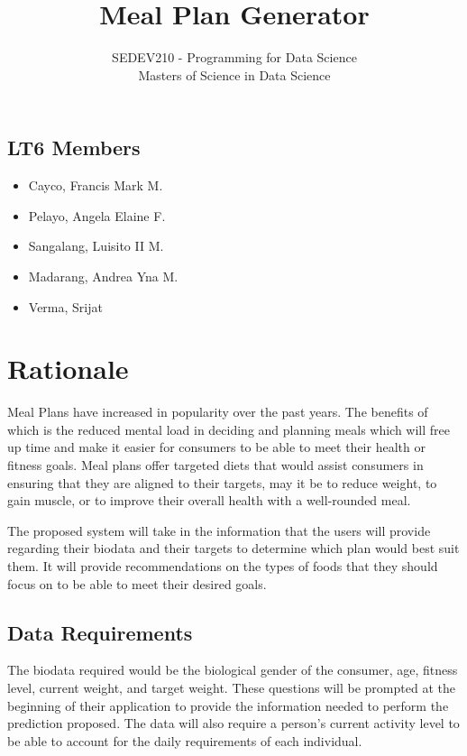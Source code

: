 \documentclass{article}
\title{Meal Plan Generator}
\author{SEDEV210 - Programming for Data Science\\Masters of Science in Data Science}
\date{}
\begin{document}
\maketitle



\subsection*{LT6 Members}
\begin{multicols}{2}
\begin{itemize}
    \item Cayco, Francis Mark M.
    \item Pelayo, Angela Elaine F.
    \item Sangalang, Luisito II M.
    \item Madarang, Andrea Yna M.
    \item Verma, Srijat
\end{itemize}
\end{multicols}

\tableofcontents

\section{Rationale}
Meal Plans have increased in popularity over the past years. The benefits of which is the reduced mental load in deciding and planning meals which will free up time and make it easier for consumers to be able to meet their health or fitness goals. Meal plans offer targeted diets that would assist consumers in ensuring that they are aligned to their targets, may it be to reduce weight, to gain muscle, or to improve their overall health with a well-rounded meal.

The proposed system will take in the information that the users will provide regarding their biodata and their targets to determine which plan would best suit them. It will provide recommendations on the types of foods that they should focus on to be able to meet their desired goals.

\subsection{Data Requirements}
The biodata required would be the biological gender of the consumer, age, fitness level, current weight, and target weight. These questions will be prompted at the beginning of their application to provide the information needed to perform the prediction proposed. The data will also require a person’s current activity level to be able to account for the daily requirements of each individual.
\end{document}
